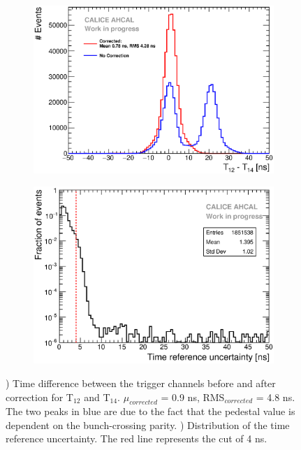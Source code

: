 \documentclass{JINST}
\begin{document}
\begin{figure}[htbp!]
  \begin{subfigure}[t]{0.49\textwidth}
    \centering
    \includegraphics[width=1\linewidth]{fig/T0_Resolution_5.eps}
    \caption{} \label{fig:T0Corr}
  \end{subfigure}
  \hfill
  \begin{subfigure}[t]{0.49\textwidth}
    \centering
    \includegraphics[width=1\linewidth]{fig/T0ReferenceError.eps}
    \caption{} \label{fig:TRefErr}
  \end{subfigure}
  \caption{) Time difference between the trigger channels before and after correction for T$_{12}$ and T$_{14}$. $\mu_{corrected}$ = 0.9 ns, RMS$_{corrected}$ = 4.8 ns. The two peaks in blue are due to the fact that the pedestal value is dependent on the bunch-crossing parity. ) Distribution of the time reference uncertainty. The red line represents the cut of 4 ns.}
\end{figure}
\end{document}
